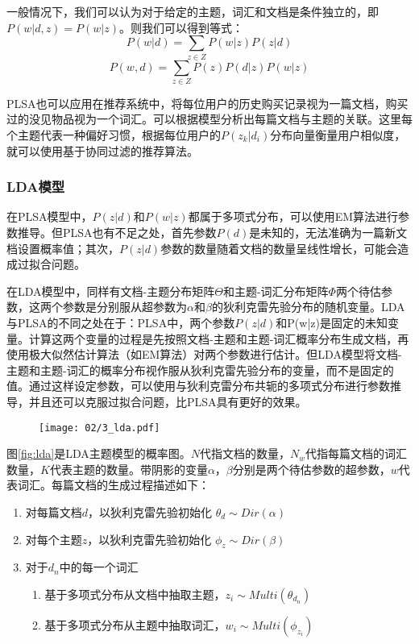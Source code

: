 一般情况下，我们可以认为对于给定的主题，词汇和文档是条件独立的，即$P(w|d,z) = P(w|z)$。则我们可以得到等式：
\begin{equation}
	P(w|d) = \sum_{z\in Z}P(w|z)P(z|d)
\end{equation}
\begin{equation}
	P(w,d) = \sum_{z\in Z}P(z)P(d|z)P(w|z)
\end{equation}

PLSA也可以应用在推荐系统中，将每位用户的历史购买记录视为一篇文档，购买过的没见物品视为一个词汇。可以根据模型分析出每篇文档与主题的关联。这里每个主题代表一种偏好习惯，根据每位用户的$P(z_k|d_i)$分布向量衡量用户相似度，就可以使用基于协同过滤的推荐算法。

\subsubsection{LDA模型}


在PLSA模型中，$P(z|d)$和$P(w|z)$都属于多项式分布，可以使用EM算法进行参数推导。但PLSA也有不足之处，首先参数$P(d)$是未知的，无法准确为一篇新文档设置概率值；其次，$P(z|d)$参数的数量随着文档的数量呈线性增长，可能会造成过拟合问题。

在LDA\cite{blei2003latent}模型中，同样有文档-主题分布矩阵$\Theta$和主题-词汇分布矩阵$\Phi$两个待估参数，这两个参数是分别服从超参数为$\alpha$和$\beta$的狄利克雷先验分布的随机变量。LDA与PLSA的不同之处在于：PLSA中，两个参数$P(z|d)$和P(w|z)是固定的未知变量。计算这两个变量的过程是先按照文档-主题和主题-词汇概率分布生成文档，再使用极大似然估计算法（如EM算法）对两个参数进行估计。但LDA模型将文档-主题和主题-词汇的概率分布视作服从狄利克雷先验分布的变量，而不是固定的值。通过这样设定参数，可以使用与狄利克雷分布共轭的多项式分布进行参数推导，并且还可以克服过拟合问题，比PLSA具有更好的效果。

\begin{figure}[!h]
 \centering
 \texttt{[image: 02/3\_lda.pdf]}
\end{figure}

图\ref{fig:lda}是LDA主题模型的概率图。$N$代指文档的数量，$N_w$代指每篇文档的词汇数量，$K$代表主题的数量。带阴影的变量$\alpha$，$\beta$分别是两个待估参数的超参数，$w$代表词汇。每篇文档的生成过程描述如下：

\begin{enumerate}
\item 对每篇文档$d$，以狄利克雷先验初始化 $\theta_d \sim Dir(\alpha)$
\item 对每个主题$z$，以狄利克雷先验初始化 $\phi_z \sim Dir(\beta)$
\item 对于$d_n$中的每一个词汇
       \begin{enumerate}[fullwidth,itemindent=1em,label=(\alph*)]
       \item 基于多项式分布从文档中抽取主题，$z_i \sim Multi(\theta_{d_n})$
       \item 基于多项式分布从主题中抽取词汇，$w_i \sim Multi(\phi_{z_i})$
       \end{enumerate}
\end{enumerate}

